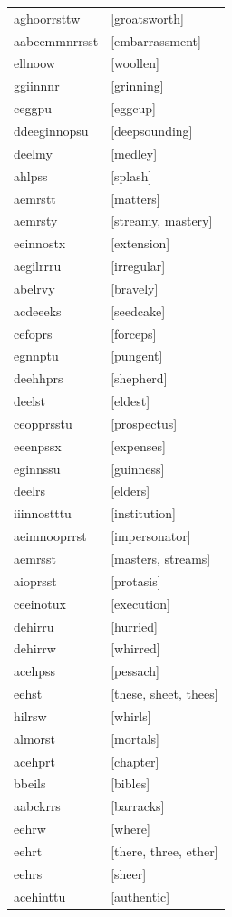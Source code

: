 \documentclass{article}
\begin{document}
\begin{tabular}{ll}
aghoorrsttw & [groatsworth] \\
aabeemmnrrsst & [embarrassment] \\
ellnoow & [woollen] \\
ggiinnnr & [grinning] \\
ceggpu & [eggcup] \\
ddeeginnopsu & [deepsounding] \\
deelmy & [medley] \\
ahlpss & [splash] \\
aemrstt & [matters] \\
aemrsty & [streamy, mastery] \\
eeinnostx & [extension] \\
aegilrrru & [irregular] \\
abelrvy & [bravely] \\
acdeeeks & [seedcake] \\
cefoprs & [forceps] \\
egnnptu & [pungent] \\
deehhprs & [shepherd] \\
deelst & [eldest] \\
ceopprsstu & [prospectus] \\
eeenpssx & [expenses] \\
eginnssu & [guinness] \\
deelrs & [elders] \\
iiinnostttu & [institution] \\
aeimnooprrst & [impersonator] \\
aemrsst & [masters, streams] \\
aioprsst & [protasis] \\
ceeinotux & [execution] \\
dehirru & [hurried] \\
dehirrw & [whirred] \\
acehpss & [pessach] \\
eehst & [these, sheet, thees] \\
hilrsw & [whirls] \\
almorst & [mortals] \\
acehprt & [chapter] \\
bbeils & [bibles] \\
aabckrrs & [barracks] \\
eehrw & [where] \\
eehrt & [there, three, ether] \\
eehrs & [sheer] \\
acehinttu & [authentic] \\

\end{tabular}
\end{document}
